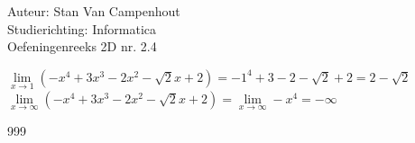 \documentclass[a4paper]{article}
\begin{document}
  
\noindent \large Auteur: Stan Van Campenhout \\
\noindent \large Studierichting:  Informatica\\
\noindent \large Oefeningenreeks 2D nr. 2.4\\

\medskip

\normalsize

$ \lim\limits_{x \rightarrow 1} \left(-x^4 + 3x^3 -2x^2 - \sqrt{2}x + 2 \right) = -1^4 + 3 - 2 - \sqrt{2} + 2  = 2 - \sqrt{2} $\\

$ \lim\limits_{x \rightarrow \infty} \left(-x^4 + 3x^3 -2x^2 - \sqrt{2}x + 2 \right) = \lim\limits_{x \rightarrow \infty} -x^4 = -\infty $\\

\begin{thebibliography}{999}
\end{thebibliography}
\end{document}

